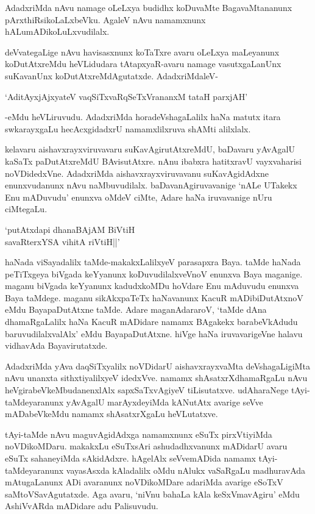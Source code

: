 AdadxriMda nAvu namage oLeLxya budidhx koDuvaMte BagavaMtananunx pArxthiRsikoLaLxbeVku. AgaleV nAvu namamxnunx hALumADikoLuLxvudilalx.

deVvategaLige nAvu havisasxnunx koTaTxre avaru oLeLxya maLeyanunx koDutAtxreMdu heVLidudara tAtapxyaR-avaru namage vasutxgaLanUnx suKavanUnx koDutAtxreMdAgutatxde. AdadxriMdaleV-

\begin{shloka}
`AditAyxjAjxyateV vaqSiTxvaRqSeTxVrananxM tataH parxjAH'
\end{shloka}

-eMdu heVLiruvudu. AdadxriMda horadeVshagaLalilx haNa matutx itara swkarayxgaLu hecAcxgidadxrU namamxlilxruva shAMti alilxlalx.

kelavaru aishavxrayxviruvavaru suKavAgirutAtxreMdU, baDavaru yAvAgalU kaSaTx paDutAtxreMdU BAvisutAtxre. nAnu ibabxra hatitxravU vayxvaharisi noVDidedxVne. AdadxriMda aishavxrayxviruvavanu suKavAgidAdxne enunxvudanunx nAvu naMbuvudilalx. baDavanAgiruvavanige `nALe UTakekx Enu mADuvudu' enunxva oMdeV ciMte, Adare haNa iruvavanige nUru ciMtegaLu.

\begin{shloka}
`putAtxdapi dhanaBAjAM BiVtiH\\
savaRterxYSA vihitA riVtiH||'
\end{shloka}

haNada viSayadalilx taMde-makakxLalilxyeV parasapxra Baya. taMde haNada peTiTxgeya biVgada keYyanunx koDuvudilalxveVnoV enunxva Baya maganige. maganu biVgada keYyanunx kadudxkoMDu hoVdare Enu mAduvudu enunxva Baya taMdege. maganu sikAkxpaTeTx haNavanunx KacuR mADibiDutAtxnoV eMdu BayapaDutAtxne taMde. Adare maganAdararoV, `taMde dAna dhamaRgaLalilx haNa KacuR mADidare namamx BAgakekx barabeVkAdudu baruvudilalxvalAlx' eMdu BayapaDutAtxne. hiVge haNa iruvavarigeVne halavu vidhavAda Bayavirutatxde.

AdadxriMda yAva daqSiTxyalilx noVDidarU aishavxrayxvaMta deVshagaLigiMta nAvu unanxta sithxtiyalilxyeV idedxVve. namamx shAsatxrXdhamaRgaLu nAvu heVgirabeVkeMbudanenxlAlx sapxSaTxvAgiyeV tiLisutatxve. udAharaNege tAyi-taMdeyaranunx yAvAgalU marAyxdeyiMda kANutAtx avarige seVve mADabeVkeMdu namamx shAsatxrXgaLu heVLutatxve.

tAyi-taMde nAvu maguvAgidAdxga namamxnunx eSuTx pirxVtiyiMda noVDikoMDaru. makakxLu eSuTxsAri ashudadhxvanunx mADidarU avaru eSuTx sahaneyiMda sAkidAdxre. hAgelAlx seVvemADida namamx tAyi-taMdeyaranunx vayasAsxda kAladalilx oMdu nAlukx vaSaRgaLu madhuravAda mAtugaLanunx ADi avaranunx noVDikoMDare adariMda avarige eSoTxV saMtoVSavAgutatxde. Aga avaru, `niVnu bahaLa kAla keSxVmavAgiru' eMdu AshiVvARda mADidare adu Palisuvudu.

